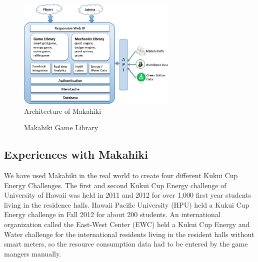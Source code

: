 \documentclass{sigchi}
\begin{document}
\begin{figure}
  \center
  \includegraphics[width=3in]{makahiki-system-architecture}
  \caption{Architecture of Makahiki}
  \label{fig:makahiki-architecture}
\end{figure}

\begin{figure}
	\center
		\caption{Makahiki Game Library}
		\label{fig:makahiki-games}
\end{figure}

\subsection{Experiences with Makahiki}

We have used Makahiki in the real world to create four different Kukui
Cup Energy Challenges. The first and second Kukui Cup Energy challenge
of University of Hawaii was held in 2011 and 2012 for over 1,000 first
year students living in the residence halls. Hawaii Pacific University
(HPU) held a Kukui Cup Energy challenge in Fall 2012 for about 200
students. An international organization called the East-West Center
(EWC) held a Kukui Cup Energy and Water challenge for the
international residents living in the resident halls without smart
meters, so the resource consumption data had to be entered by the game
mangers manually.
\end{document}
